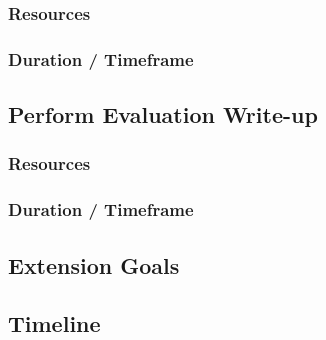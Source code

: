 	\subsubsection{Resources}
	
	\subsubsection{Duration / Timeframe}
	
\subsection{Perform Evaluation Write-up}

\subsubsection{Resources}

\subsubsection{Duration / Timeframe}

\subsection{Extension Goals}

\subsection{Timeline}